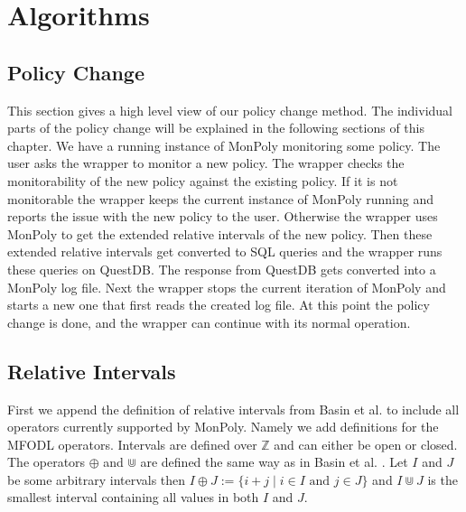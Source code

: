 \chapter{Algorithms}

\section{Policy Change}
This section gives a high level view of our policy change method.
The individual parts of the policy change will be explained in the following sections of this chapter.
We have a running instance of MonPoly monitoring some policy.
The user asks the wrapper to monitor a new policy.
The wrapper checks the monitorability of the new policy against the existing policy.
If it is not monitorable the wrapper keeps the current instance of MonPoly running and reports the issue with the new policy to the user.
Otherwise the wrapper uses MonPoly to get the extended relative intervals of the new policy.
Then these extended relative intervals get converted to SQL queries and the wrapper runs these queries on QuestDB.
The response from QuestDB gets converted into a MonPoly log file.
Next the wrapper stops the current iteration of MonPoly and starts a new one that first reads the created log file.
At this point the policy change is done, and the wrapper can continue with its normal operation.



\section{Relative Intervals}

First we append the definition of relative intervals from Basin et al. \cite{Basin2016} to include all operators currently supported by MonPoly.
Namely we add definitions for the MFODL operators.
Intervals are defined over $\mathbb{Z}$ and can either be open or closed.
The operators $\oplus$ and $\Cup$ are defined the same way as in Basin et al. \cite{Basin2016}.
Let $I$ and $J$ be some arbitrary intervals then $I \oplus J := \{i+j \mid i \in I \text{ and } j \in J\}$ and $I \Cup J$ is the smallest interval containing all values in both $I$ and $J$.

